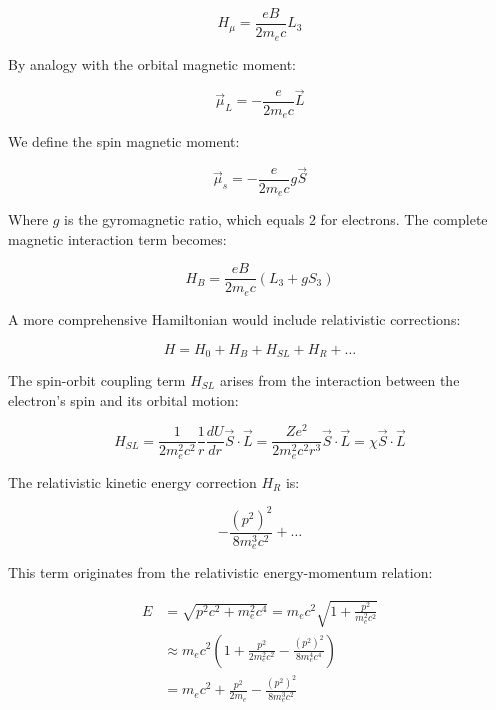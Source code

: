 \begin{equation}
H_{\mu}=\frac{eB}{2m_e c}L_3
\end{equation}

By analogy with the orbital magnetic moment:

\begin{equation}
\vec{\mu}_L=-\frac{e}{2m_e c}\vec{L}
\end{equation}

We define the spin magnetic moment:

\begin{equation}
\vec{\mu}_s=-\frac{e}{2m_e c}g\vec{S}
\end{equation}

Where $g$ is the gyromagnetic ratio, which equals 2 for electrons. The complete magnetic interaction term becomes:

\begin{equation}
H_B=\frac{eB}{2m_e c}(L_3+gS_3)
\end{equation}

A more comprehensive Hamiltonian would include relativistic corrections:

\begin{equation}
H=H_0+H_B+H_{SL}+H_R+\ldots
\end{equation}

The spin-orbit coupling term $H_{SL}$ arises from the interaction between the electron's spin and its orbital motion:

\begin{equation}
H_{SL}=\frac{1}{2m_e^2c^2}\frac{1}{r}\frac{dU}{dr}\vec{S}\cdot\vec{L}=\frac{Ze^2}{2m_e^2c^2r^3}\vec{S}\cdot\vec{L}=\chi\vec{S}\cdot\vec{L}
\end{equation}

The relativistic kinetic energy correction $H_R$ is:

\begin{equation}
-\frac{(p^2)^2}{8m_e^3c^2}+\ldots
\end{equation}

This term originates from the relativistic energy-momentum relation:

\begin{align}
E &=\sqrt{p^2c^2+m_e^2c^4}=m_ec^2\sqrt{1+\frac{p^2}{m_e^2c^2}}\\
&\approx m_ec^2\left(1+\frac{p^2}{2m_e^2c^2}-\frac{(p^2)^2}{8m_e^4c^4}\right)\\
&=m_ec^2+\frac{p^2}{2m_e}-\frac{(p^2)^2}{8m_e^3c^2}
\end{align}


